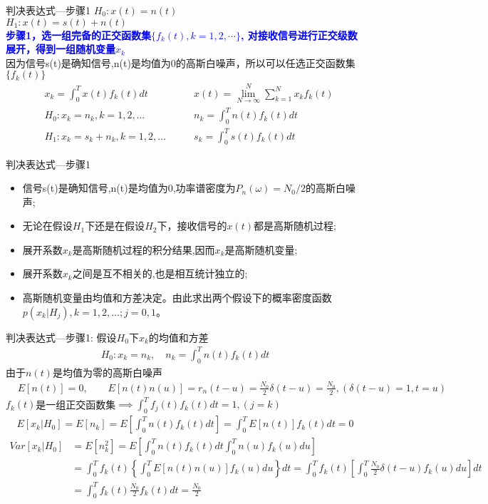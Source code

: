 \begin{frame}{判决表达式---步骤1}
$H_0: x(t)=n(t)$\\
$H_1: x(t)=s(t)+n(t)$\\
\textbf{\textcolor{blue}{步骤1，选一组完备的正交函数集$\{f_k(t),k=1,2,\cdots \}$, 对接收信号进行正交级数展开，得到一组随机变量$x_k$}}\\
因为信号s(t)是确知信号,n(t)是均值为0的高斯白噪声，所以可以任选正交函数集$\{f_k(t)\}$
\begin{align*}
&x_k=\int_{0}^{T}x(t)f_k(t)dt &\qquad x(t)=\lim\limits_{N\to\infty}^N\sum\limits_{k=1}^Nx_kf_k(t)\\
&H_0: x_k=n_k,k=1,2,\dots &\qquad n_k=\int_{0}^{T}n(t)f_k(t)dt\\
&H_1: x_k=s_k+n_k,k=1,2,\dots &\qquad s_k=\int_{0}^{T}s(t)f_k(t)dt
\end{align*}
\end{frame}

\begin{frame}{判决表达式---步骤1}
\begin{itemize}
	\item 信号s(t)是确知信号,n(t)是均值为0,功率谱密度为$P_n(\omega)=N_0/2$的高斯白噪声;
	\item 无论在假设$H_1$下还是在假设$H_2$下，接收信号的$x(t)$都是高斯随机过程;
	\item 展开系数$x_k$是高斯随机过程的积分结果,因而$x_k$是高斯随机变量;
	\item 展开系数$x_k$之间是互不相关的,也是相互统计独立的;
	\item 高斯随机变量由均值和方差决定。由此求出两个假设下的概率密度函数$p(x_k|H_j),k=1,2,\dots;j=0,1$。
\end{itemize}
\end{frame}

\begin{frame}[shrink]{判决表达式---步骤1: 假设$H_0$下$x_k$的均值和方差}
\begin{align*}
H_0: x_k=n_k, \quad n_k=\int_{0}^{T}n(t)f_k(t)dt
\end{align*}
由于$n(t)$是均值为零的高斯白噪声
\begin{align*}
&E[n(t)]=0, \qquad E[n(t)n(u)]=r_n(t-u) =\frac{N_0}{2}\delta(t-u)=\frac{N_0}{2},(\delta(t-u)=1,t=u)
\end{align*}
$f_k(t)$是一组正交函数集$\implies\int_{0}^{T}f_j(t)f_k(t)dt=1,(j=k)$
\begin{align*}
E[x_k|H_0]=E[n_k]=E\left[\int_{0}^{T}n(t)f_k(t)dt\right]=\int_{0}^{T}E[n(t)]f_k(t)dt=0
\end{align*}
\begin{align*}
Var[x_k|H_0]&=E[n_k^2]=E\left[\int_{0}^{T}n(t)f_k(t)dt\int_{0}^{T}n(u)f_k(u)du\right]\\
&=\int_{0}^{T}f_k(t)\left\{\int_{0}^{T}E[n(t)n(u)]f_k(u)du\right\}dt=\int_{0}^{T}f_k(t)\left[\int_{0}^{T}\frac{N_0}{2}\delta(t-u)f_k(u)du\right]dt\\
&=\int_{0}^{T}f_k(t)\frac{N_0}{2}f_k(t)dt=\frac{N_0}{2}
\end{align*}
\end{frame}

